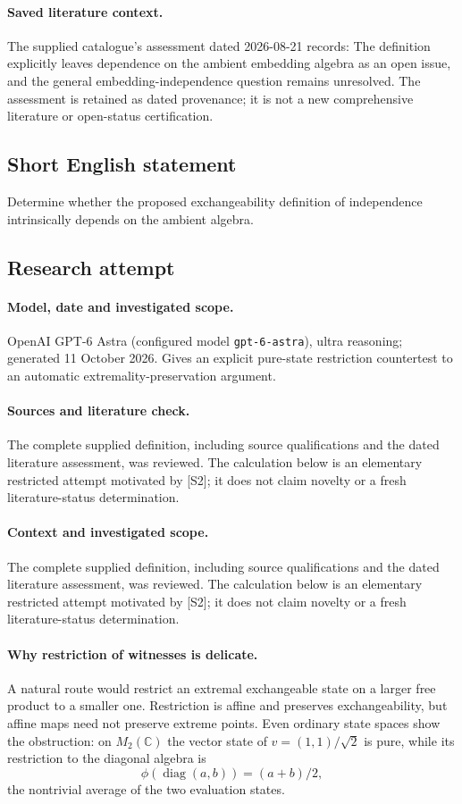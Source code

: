 \documentclass[11pt]{article}
\begin{document}
\paragraph{Saved literature context.} The supplied catalogue's assessment dated 2026-08-21 records: The definition explicitly leaves dependence on the ambient embedding algebra as an open issue, and the general embedding-independence question remains unresolved. The assessment is retained as dated provenance; it is not a new comprehensive literature or open-status certification.
\subsection{Short English statement}
Determine whether the proposed exchangeability definition of independence intrinsically depends on the ambient algebra.
\subsection{Research attempt}
\paragraph{Model, date and investigated scope.}
OpenAI GPT-6 Astra (configured model \texttt{gpt-6-astra}), ultra reasoning; generated 11 October 2026. Gives an explicit pure-state restriction countertest to an automatic extremality-preservation argument.

\paragraph{Sources and literature check.}
The complete supplied definition, including source qualifications and the dated literature assessment, was reviewed. The calculation below is an elementary restricted attempt motivated by [S2]; it does not claim novelty or a fresh literature-status determination.

\paragraph{Context and investigated scope.} The complete supplied definition, including source qualifications and the dated literature assessment, was reviewed. The calculation below is an elementary restricted attempt motivated by [S2]; it does not claim novelty or a fresh literature-status determination.

\paragraph{Why restriction of witnesses is delicate.} A natural route would restrict an extremal exchangeable state on a larger free product to a smaller one. Restriction is affine and preserves exchangeability, but affine maps need not preserve extreme points. Even ordinary state spaces show the obstruction: on $M_2(\mathbb C)$ the vector state of $v=(1,1)/\sqrt2$ is pure, while its restriction to the diagonal algebra is
\[
 \phi(\operatorname{diag}(a,b))=(a+b)/2,
\]
the nontrivial average of the two evaluation states.
\end{document}

